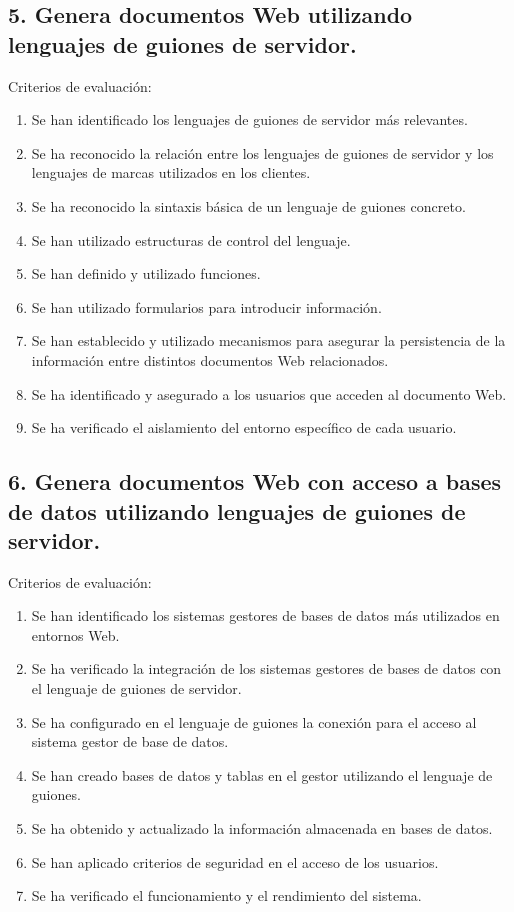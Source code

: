 \documentclass[a4paper]{article}
\begin{document}
\subsection{5. Genera documentos Web utilizando lenguajes de guiones de servidor.}
\label{sec:org0000027}
Criterios de evaluación:
\begin{enumerate}
\item Se han identificado los lenguajes de guiones de servidor más relevantes.
\item Se ha reconocido la relación entre los lenguajes de guiones de servidor y los lenguajes de marcas utilizados en los clientes.
\item Se ha reconocido la sintaxis básica de un lenguaje de guiones concreto.
\item Se han utilizado estructuras de control del lenguaje.
\item Se han definido y utilizado funciones.
\item Se han utilizado formularios para introducir información.
\item Se han establecido y utilizado mecanismos para asegurar la persistencia de la información entre distintos documentos Web relacionados.
\item Se ha identificado y asegurado a los usuarios que acceden al documento Web.
\item Se ha verificado el aislamiento del entorno específico de cada usuario.
\end{enumerate}
\subsection{6. Genera documentos Web con acceso a bases de datos utilizando lenguajes de guiones de servidor.}
\label{sec:org000002a}
Criterios de evaluación:
\begin{enumerate}
\item Se han identificado los sistemas gestores de bases de datos más utilizados en entornos Web.
\item Se ha verificado la integración de los sistemas gestores de bases de datos con el lenguaje de guiones de servidor.
\item Se ha configurado en el lenguaje de guiones la conexión para el acceso al sistema gestor de base de datos.
\item Se han creado bases de datos y tablas en el gestor utilizando el lenguaje de guiones.
\item Se ha obtenido y actualizado la información almacenada en bases de datos.
\item Se han aplicado criterios de seguridad en el acceso de los usuarios.
\item Se ha verificado el funcionamiento y el rendimiento del sistema.
\end{enumerate}
\end{document}
